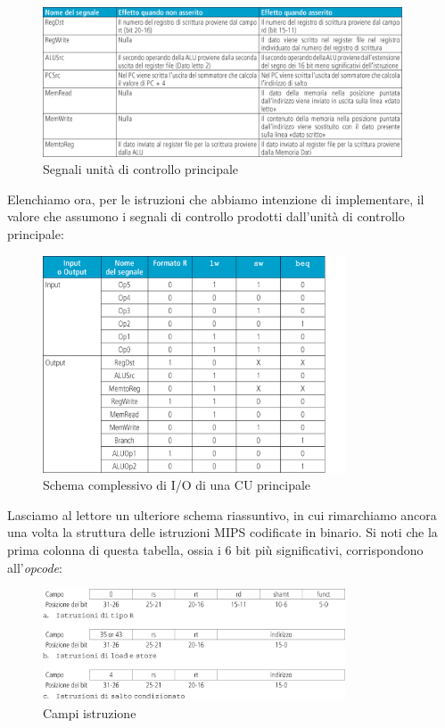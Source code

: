 \documentclass[class=book, crop=false, oneside]{standalone}
\begin{document}
\begin{figure}[H]
	\centering
	\includegraphics[width=0.95\textwidth,keepaspectratio]{segnali_controllo.png}
	\caption{Segnali unità di controllo principale}
\end{figure}
Elenchiamo ora, per le istruzioni che abbiamo intenzione di implementare, il valore che assumono i segnali di controllo prodotti dall'unità di controllo principale:

\begin{figure}[H]
	\centering
	\includegraphics[width=0.80\textwidth,keepaspectratio]{io_CU.png}
	\caption{Schema complessivo di I/O di una CU principale}
\end{figure}
Lasciamo al lettore un ulteriore schema riassuntivo, in cui rimarchiamo ancora una volta la struttura delle istruzioni MIPS codificate in binario. Si noti che la prima colonna di questa tabella, ossia i 6 bit più significativi, corrispondono all'\emph{opcode}:
\begin{figure}[H]
	\centering
	\includegraphics[width=0.80\textwidth,keepaspectratio]{campi_istruzione.png}
	\caption{Campi istruzione}
\end{figure}
\end{document}

